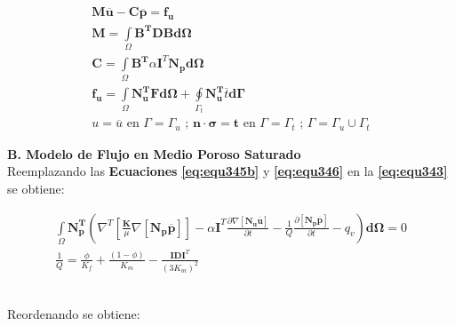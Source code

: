 \begin{ceqn} 
\begin{subequations} \label{eq:equ352} 
\begin{gather}
\mathbf{M}\mathbf{\overline{u}} - \mathbf{C}\mathbf{\overline{p}} = \mathbf{f_u}\label{eq:equ352a}\\[12pt]
\mathbf{M} = \int\limits_\Omega \mathbf{B^T}\mathbf{D}\mathbf{B}\mathbf{d\Omega} \label{eq:equ352b}\\[12pt]
\mathbf{C} =  \int\limits_\Omega \mathbf{B^T}\alpha\mathbf{I}^T\mathbf{N_p}\mathbf{d\Omega} \label{eq:equ352c}\\[12pt]
\mathbf{f_u} = \int\limits_\Omega \mathbf{N_{u}^T}\mathbf{F}\mathbf{d\Omega} + \oint\limits_{\Gamma_{t}}  \mathbf{N_{u}^T} \overline{t} \mathbf{d\Gamma} \label{eq:equ352d}\\[12pt]
u = \overline{u} \text{  en  } \Gamma = \Gamma_u \text{ ;  } \mathbf{n}\cdot\mathbf{\sigma}=\mathbf{t} \text{  en  } \Gamma = \Gamma_t \text{ ; } \Gamma = \Gamma_u \cup \Gamma_t \label{eq:equ352e}
\end{gather}  
\end{subequations} 
\end{ceqn}

\bigskip
\textbf{B. Modelo de Flujo en Medio Poroso Saturado}\\
Reemplazando las \textbf{Ecuaciones} \textbf{\ref{eq:equ345b}} y \textbf{\ref{eq:equ346}} en la \textbf{\ref{eq:equ343}} se obtiene:\bigskip

\begin{ceqn} 
\begin{subequations} \label{eq:equ353} 
\begin{gather}
\int\limits_\Omega \mathbf{N_{p}^T}\left( \nabla^T \left[\frac{\mathbf{K}}{\mu}\nabla [\mathbf{N_p}\mathbf{\overline{p}}]\right] - \alpha\mathbf{I}^T\frac{\partial \nabla [\mathbf{N_u}\mathbf{\overline{u}}]}{\partial t} -\frac{1}{Q}\frac{\partial [\mathbf{N_p}\mathbf{\overline{p}}]}{\partial t} - q_v\right)\mathbf{d\Omega} = 0 \label{eq:equ353a} \\[12pt]
\frac{1}{Q}=\frac{\phi}{K_f}+\frac{(1-\phi)}{K_m}-\frac{\mathbf{I}\mathbf{D}\mathbf{I}^T}{(3K_{m})^{2}} \label{eq:equ353b}
\end{gather}  
\end{subequations} 
\end{ceqn}
\\
Reordenando se obtiene:

